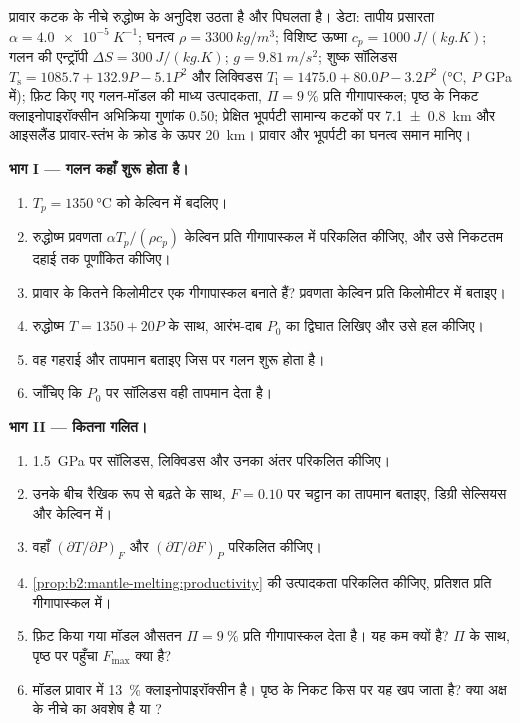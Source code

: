 \begin{problem}[{सप्ताहांत समस्या --- प्रावार रुद्धोष्म से महासागरीय भूपर्पटी की
मोटाई तक, और वापस प्रावार के तापमान तक}]
\label{pb:b2:mantle-melting:1}
प्रावार कटक के नीचे रुद्धोष्म के अनुदिश उठता है और पिघलता है। डेटा: तापीय
प्रसारता $\alpha = \qty{4.0e-5}{K^{-1}}$; घनत्व $\rho = \qty{3300}{kg/m^3}$;
विशिष्ट ऊष्मा $c_p = \qty{1000}{J/(kg.K)}$; गलन की एन्ट्रॉपी $\Delta S =
\qty{300}{J/(kg.K)}$; $g = \qty{9.81}{m/s^2}$; शुष्क सॉलिडस $T_{\mathrm s} =
1085.7 + 132.9P - 5.1P^2$ और  लिक्विडस $T_{\mathrm l} = 1475.0 +
80.0P - 3.2P^2$ (\unit{\celsius}, $P$ \unit{GPa} में); फ़िट किए गए गलन-मॉडल की
माध्य उत्पादकता, $\Pi = \qty{9}{\percent}$ प्रति गीगापास्कल; पृष्ठ के निकट क्लाइनोपाइरॉक्सीन
अभिक्रिया गुणांक 0.50; प्रेक्षित भूपर्पटी सामान्य कटकों पर \qty[uncertainty-mode=separate]{7.1 \pm 0.8}{km}
और आइसलैंड प्रावार-स्तंभ के क्रोड के ऊपर \qty{20}{km}। प्रावार
और भूपर्पटी का घनत्व समान मानिए।

\noindent\textbf{भाग I --- गलन कहाँ शुरू होता है।}
\begin{enumerate}
\item $T_p = \qty{1350}{\celsius}$ को केल्विन में बदलिए।
\item रुद्धोष्म प्रवणता $\alpha T_p/(\rho c_p)$ केल्विन प्रति
गीगापास्कल में परिकलित कीजिए, और उसे निकटतम दहाई तक पूर्णांकित कीजिए।
\item प्रावार के कितने किलोमीटर एक गीगापास्कल बनाते हैं? प्रवणता
केल्विन प्रति किलोमीटर में बताइए।
\item रुद्धोष्म $T = 1350 + 20P$ के साथ, आरंभ-दाब
$P_0$ का द्विघात लिखिए और उसे हल कीजिए।
\item वह गहराई और तापमान बताइए जिस पर गलन शुरू होता है।
\item जाँचिए कि $P_0$ पर सॉलिडस वही तापमान देता है।
\end{enumerate}

\noindent\textbf{भाग II --- कितना गलित।}
\begin{enumerate}[resume]
\item \qty{1.5}{GPa} पर सॉलिडस,  लिक्विडस और उनका
अंतर परिकलित कीजिए।
\item उनके बीच रैखिक रूप से बढ़ते  के साथ, $F = 0.10$ पर चट्टान का
तापमान बताइए, डिग्री सेल्सियस और केल्विन में।
\item वहाँ $(\partial T/\partial P)_F$ और $(\partial T/\partial F)_P$ परिकलित कीजिए।
\item \cref{prop:b2:mantle-melting:productivity} की उत्पादकता परिकलित कीजिए,
प्रतिशत प्रति गीगापास्कल में।
\item फ़िट किया गया मॉडल औसतन $\Pi = \qty{9}{\percent}$ प्रति गीगापास्कल देता है।
यह कम क्यों है? $\Pi$ के साथ, पृष्ठ पर पहुँचा  $F_{\max}$
क्या है?
\item मॉडल प्रावार में \qty{13}{\percent} क्लाइनोपाइरॉक्सीन है। पृष्ठ के निकट किस 
पर यह खप जाता है? क्या अक्ष के नीचे का अवशेष
 है या ?
\end{enumerate}


\end{problem}
